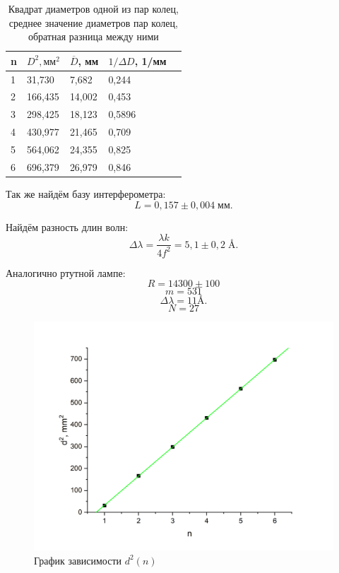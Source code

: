 \documentclass[12pt,a4paper]{extreport}
\begin{document}
\begin{table}[!h]
	\centering
	\begin{tabular}{|l|l|l|l|l|}
		\hline
		n & $D^2, \text{мм}^2$ & $\overline{D}$, мм & $1/\Delta D$, 1/мм \\ \hline
		1 & 31,730    & 7,682           & 0,244      \\ \hline
		2 & 166,435   & 14,002         & 0,453      \\ \hline
		3 & 298,425   & 18,123         & 0,5896      \\ \hline
		4 & 430,977   & 21,465         & 0,709      \\ \hline
		5 & 564,062   & 24,355        & 0,825      \\ \hline
		6 & 696,379   & 26,979         & 0,846       \\ \hline
	\end{tabular}
	\caption{Квадрат диаметров одной из пар колец, среднее значение диаметров пар колец, обратная разница между ними}
	\label{tab:my-table}
\end{table}

Так же найдём базу интерферометра:
\begin{equation*}\label{key}
	L = 0,157\pm 0,004 \; мм.
\end{equation*}

Найдём разность длин волн:
\begin{equation*}\label{key}
	\Delta \lambda = \frac{\lambda k}{4 f^2} = 5,1\pm 0,2\; \si{\angstrom}.
\end{equation*}

Аналогично ртутной лампе:
\[R = 14300 \pm 100\]
\[m = 531\]
\[\Delta \lambda = 11 \si{\angstrom}.\]
\[N = 27\]

\begin{figure}[!h]
	\centering
	\includegraphics[width=0.7\linewidth]{3.png}
	\caption{График зависимости $ d^2(n)$}
	\label{fig:screenshot6}
\end{figure}
\end{document}
